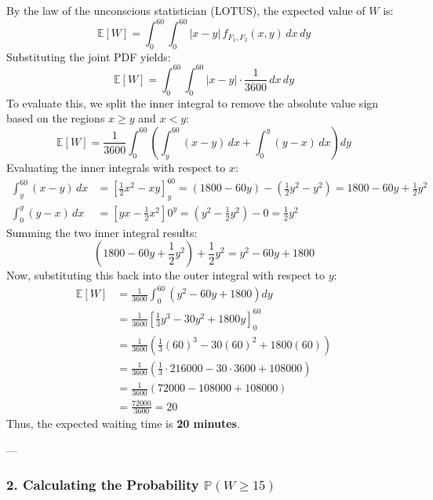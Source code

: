 \documentclass[a4paper,12pt]{article}
\begin{document}
By the law of the unconscious statistician (LOTUS), the expected value of $W$ is:
\[
\mathbb{E}[W] = \int_{0}^{60} \int_{0}^{60} |x - y| \, f_{F_1, F_2}(x, y) \, dx \, dy
\]
Substituting the joint PDF yields:
\[
\mathbb{E}[W] = \int_{0}^{60} \int_{0}^{60} |x - y| \cdot \frac{1}{3600} \, dx \, dy
\]
To evaluate this, we split the inner integral to remove the absolute value sign based on the regions $x \ge y$ and $x < y$:
\[
\mathbb{E}[W] = \frac{1}{3600} \int_{0}^{60} \left( \int_{y}^{60} (x - y) \, dx + \int_{0}^{y} (y - x) \, dx \right) dy
\]
Evaluating the inner integrals with respect to $x$:
\begin{align*}
\int_{y}^{60} (x - y) \, dx &= \left[ \frac{1}{2}x^2 - xy \right]_{y}^{60} = (1800 - 60y) - \left( \frac{1}{2}y^2 - y^2 \right) = 1800 - 60y + \frac{1}{2}y^2 \\
\int_{0}^{y} (y - x) \, dx &= \left[ yx - \frac{1}{2}x^2 \right]{0}^{y} = \left( y^2 - \frac{1}{2}y^2 \right) - 0 = \frac{1}{2}y^2
\end{align*}
Summing the two inner integral results:
\[
\left( 1800 - 60y + \frac{1}{2}y^2 \right) + \frac{1}{2}y^2 = y^2 - 60y + 1800
\]
Now, substituting this back into the outer integral with respect to $y$:
\begin{align*}
\mathbb{E}[W] &= \frac{1}{3600} \int_{0}^{60} \left( y^2 - 60y + 1800 \right) dy \\
&= \frac{1}{3600} \left[ \frac{1}{3}y^3 - 30y^2 + 1800y \right]_{0}^{60} \\
&= \frac{1}{3600} \left( \frac{1}{3}(60)^3 - 30(60)^2 + 1800(60) \right) \\
&= \frac{1}{3600} \left( \frac{1}{3} \cdot 216000 - 30 \cdot 3600 + 108000 \right) \\
&= \frac{1}{3600} \left( 72000 - 108000 + 108000 \right) \\
&= \frac{72000}{3600} = 20
\end{align*}
Thus, the expected waiting time is \textbf{20 minutes}.

---

\subsubsection*{2. Calculating the Probability $\mathbb{P}(W \ge 15)$}
\end{document}
